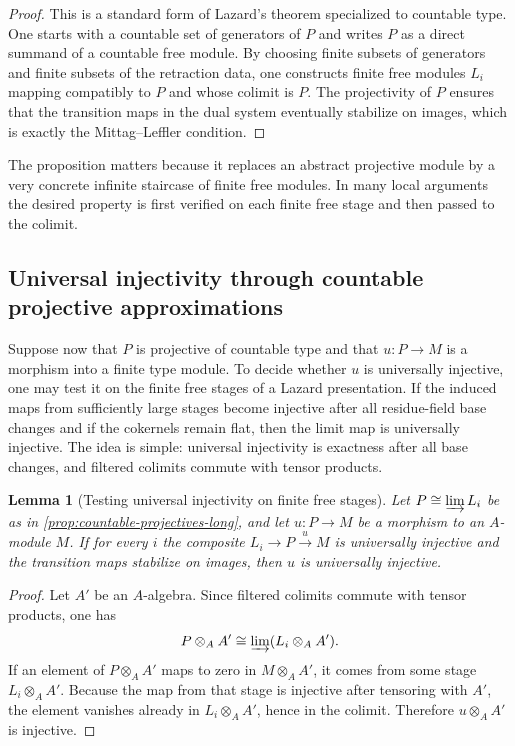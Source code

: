 \documentclass[11pt,oneside]{article}
\newtheorem{lemma}[theorem]{Lemma}
\begin{document}
\begin{proof}
This is a standard form of Lazard's theorem specialized to countable type.  One starts with a countable set of generators of $P$ and writes $P$ as a direct summand of a countable free module.  By choosing finite subsets of generators and finite subsets of the retraction data, one constructs finite free modules $L_i$ mapping compatibly to $P$ and whose colimit is $P$.  The projectivity of $P$ ensures that the transition maps in the dual system eventually stabilize on images, which is exactly the Mittag--Leffler condition.
\end{proof}

The proposition matters because it replaces an abstract projective module by a very concrete infinite staircase of finite free modules.  In many local arguments the desired property is first verified on each finite free stage and then passed to the colimit.

\subsection{Universal injectivity through countable projective approximations}

Suppose now that $P$ is projective of countable type and that $u\colon P\to M$ is a morphism into a finite type module.  To decide whether $u$ is universally injective, one may test it on the finite free stages of a Lazard presentation.  If the induced maps from sufficiently large stages become injective after all residue-field base changes and if the cokernels remain flat, then the limit map is universally injective.  The idea is simple: universal injectivity is exactness after all base changes, and filtered colimits commute with tensor products.

\begin{lemma}[Testing universal injectivity on finite free stages]\label{lem:ui-on-stages}
Let $P\cong \varinjlim L_i$ be as in \cref{prop:countable-projectives-long}, and let $u\colon P\to M$ be a morphism to an $A$-module $M$.  If for every $i$ the composite $L_i\to P\xrightarrow{u} M$ is universally injective and the transition maps stabilize on images, then $u$ is universally injective.
\end{lemma}

\begin{proof}
Let $A'$ be an $A$-algebra.  Since filtered colimits commute with tensor products, one has
\[
P\otimes_A A'\cong \varinjlim (L_i\otimes_A A').
\]
If an element of $P\otimes_A A'$ maps to zero in $M\otimes_A A'$, it comes from some stage $L_i\otimes_A A'$.  Because the map from that stage is injective after tensoring with $A'$, the element vanishes already in $L_i\otimes_A A'$, hence in the colimit.  Therefore $u\otimes_A A'$ is injective.
\end{proof}
\end{document}
